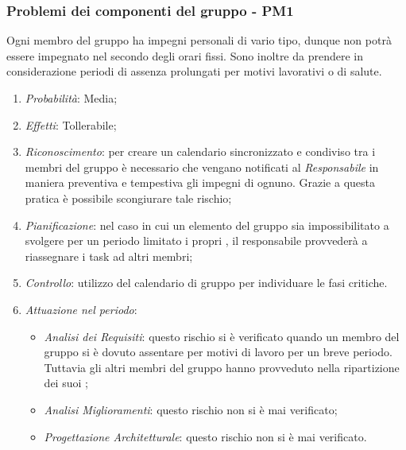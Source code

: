 \subsubsection{Problemi dei componenti del gruppo - PM1}
Ogni membro del gruppo ha impegni personali di vario tipo, dunque non potr\`a essere impegnato nel  secondo degli orari fissi. Sono inoltre da prendere in considerazione periodi di assenza prolungati per motivi lavorativi o di salute.
\begin{enumerate}
\item \textit{Probabilit\`a}: Media;
\item \textit{Effetti}: Tollerabile;
\item \textit{Riconoscimento}: per creare un calendario sincronizzato e condiviso tra i membri del gruppo è necessario che vengano notificati al \textit{Responsabile} in maniera preventiva e tempestiva gli impegni di ognuno. Grazie a questa pratica è possibile scongiurare tale rischio;
\item \textit{Pianificazione}: nel caso in cui un elemento del gruppo sia impossibilitato a svolgere per un periodo limitato i propri , il responsabile provveder\`a a riassegnare i task ad altri membri;
\item \textit{Controllo}: utilizzo del calendario di gruppo per individuare le fasi critiche.
\item \textit{Attuazione nel periodo}: 
	\begin{itemize}
	\item \textit{Analisi dei Requisiti}: questo rischio si è verificato quando un membro del gruppo si è dovuto assentare per motivi di lavoro per un breve periodo. Tuttavia gli altri membri del gruppo hanno provveduto nella ripartizione dei suoi ;
	\item \textit{Analisi Miglioramenti}: questo rischio non si è mai verificato;
	\item \textit{Progettazione Architetturale}: questo rischio non si è mai verificato.
	\end{itemize}
\end{enumerate}

